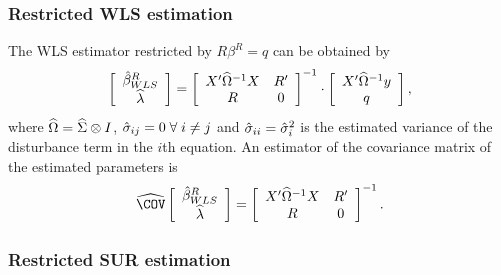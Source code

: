 \subsubsection{Restricted WLS estimation}

The WLS estimator restricted by $R \beta^R = q$ can be obtained by
\begin{equation}
   \left[ \begin{array}{c}
      \hat{\beta}^R_{WLS} \\ \widehat{\lambda}
   \end{array} \right]
   =
   \left[ \begin{array}{cc}
      X' \widehat{\Omega}^{-1} X & R' \\
      R & 0
   \end{array} \right]^{-1}
   \cdot
   \left[ \begin{array}{c}
      X' \widehat{\Omega}^{-1} y \\ q
   \end{array} \right] ,
\end{equation}
where $\widehat{\Omega} = \widehat{\Sigma} \otimes I$,
$\hat{\sigma}_{ij} = 0 \; \forall \; i \neq j$ and
$\hat{\sigma}_{ii} = \hat{\sigma}_i^2$ is the estimated variance
of the disturbance term in the $i$th equation.
An estimator of the covariance matrix of the estimated parameters is
\begin{equation}
   \COVHat
   \left[ \begin{array}{c}
      \bHat^R_{WLS} \\ \widehat{\lambda}
   \end{array} \right] 
   = 
   \left[ \begin{array}{cc}
      X' \OHat^{-1} X & R' \\
      R & 0
   \end{array} \right]^{-1} .
\end{equation}

\subsubsection{Restricted SUR estimation}

